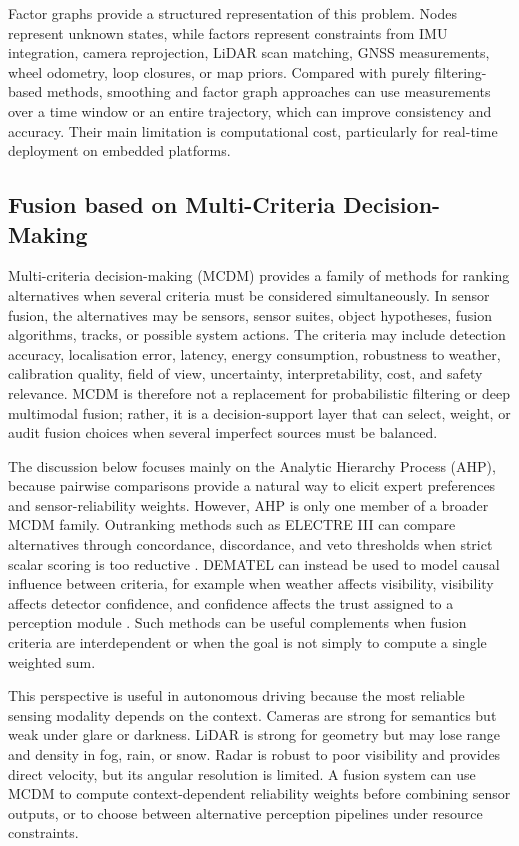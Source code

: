 \documentclass{ieeeaccess}
\begin{document}
Factor graphs provide a structured representation of this problem. Nodes represent unknown states, while factors represent constraints from IMU integration, camera reprojection, LiDAR scan matching, GNSS measurements, wheel odometry, loop closures, or map priors. Compared with purely filtering-based methods, smoothing and factor graph approaches can use measurements over a time window or an entire trajectory, which can improve consistency and accuracy. Their main limitation is computational cost, particularly for real-time deployment on embedded platforms.

\subsection{Fusion based on Multi-Criteria Decision-Making}

Multi-criteria decision-making (MCDM) provides a family of methods for ranking alternatives when several criteria must be considered simultaneously. In sensor fusion, the alternatives may be sensors, sensor suites, object hypotheses, fusion algorithms, tracks, or possible system actions. The criteria may include detection accuracy, localisation error, latency, energy consumption, robustness to weather, calibration quality, field of view, uncertainty, interpretability, cost, and safety relevance. MCDM is therefore not a replacement for probabilistic filtering or deep multimodal fusion; rather, it is a decision-support layer that can select, weight, or audit fusion choices when several imperfect sources must be balanced.

The discussion below focuses mainly on the Analytic Hierarchy Process (AHP), because pairwise comparisons provide a natural way to elicit expert preferences and sensor-reliability weights. However, AHP is only one member of a broader MCDM family. Outranking methods such as ELECTRE III can compare alternatives through concordance, discordance, and veto thresholds when strict scalar scoring is too reductive \cite{roy_electreiii_1978}. DEMATEL can instead be used to model causal influence between criteria, for example when weather affects visibility, visibility affects detector confidence, and confidence affects the trust assigned to a perception module \cite{gabus_fontela_dematel_1972}. Such methods can be useful complements when fusion criteria are interdependent or when the goal is not simply to compute a single weighted sum.

This perspective is useful in autonomous driving because the most reliable sensing modality depends on the context. Cameras are strong for semantics but weak under glare or darkness. LiDAR is strong for geometry but may lose range and density in fog, rain, or snow. Radar is robust to poor visibility and provides direct velocity, but its angular resolution is limited. A fusion system can use MCDM to compute context-dependent reliability weights before combining sensor outputs, or to choose between alternative perception pipelines under resource constraints.
\end{document}
